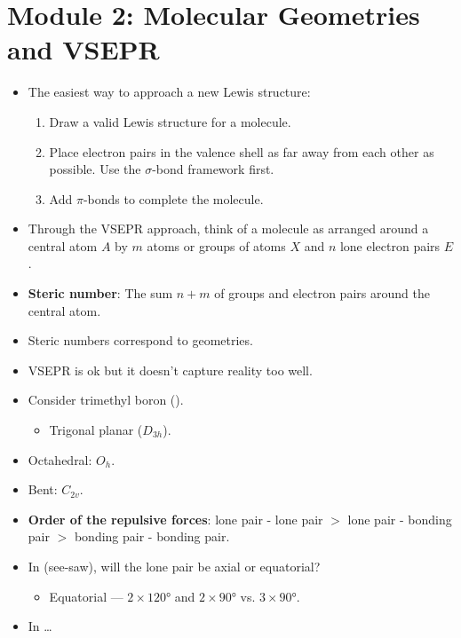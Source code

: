 \documentclass[../main.tex]{subfiles}
\begin{document}
\section{Module 2: Molecular Geometries and VSEPR}
\begin{itemize}
    \item The easiest way to approach a new Lewis structure:
    \begin{enumerate}
        \item Draw a valid Lewis structure for a molecule.
        \item Place electron pairs in the valence shell as far away from each other as possible. Use the $\sigma$-bond framework first.
        \item Add $\pi$-bonds to complete the molecule.
    \end{enumerate}
    \item Through the VSEPR approach, think of a molecule as arranged around a central atom $A$ by $m$ atoms or groups of atoms $X$ and $n$ lone electron pairs $E$.
    \item \textbf{Steric number}: The sum $n+m$ of groups and electron pairs around the central atom.
    \item Steric numbers correspond to geometries.
    \item VSEPR is ok but it doesn't capture reality too well.
    \item Consider trimethyl boron ().
    \begin{itemize}
        \item Trigonal planar ($D_{3h}$).
    \end{itemize}
    \item Octahedral: $O_h$.
    \item Bent: $C_{2v}$.
    \item \textbf{Order of the repulsive forces}: lone pair - lone pair $>$ lone pair - bonding pair $>$ bonding pair - bonding pair.
    \item In  (see-saw), will the lone pair be axial or equatorial?
    \begin{itemize}
        \item Equatorial --- $2\times\ang{120}$ and $2\times\ang{90}$ vs. $3\times\ang{90}$.
    \end{itemize}
    \item In \dots
    \begin{figure}[h!]
        \centering
        \begin{subfigure}[b]{0.2\linewidth}

\end{subfigure}
\end{figure}
\end{itemize}
\end{document}
